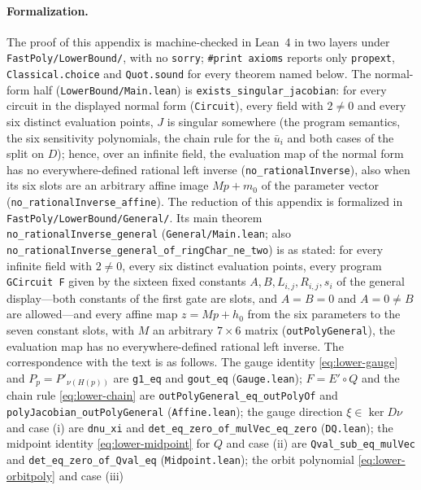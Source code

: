 \paragraph{Formalization.}
The proof of this appendix is machine-checked in Lean~4 in two layers under
\texttt{FastPoly/\allowbreak LowerBound/}, with no \texttt{sorry}; \texttt{\#print axioms}
reports only \texttt{propext}, \texttt{Classical.choice} and \texttt{Quot.sound} for
every theorem named below.  The normal-form half (\texttt{LowerBound/\allowbreak Main.lean})
is \texttt{exists\_singular\_jacobian}: for every circuit in the displayed normal form
(\texttt{Circuit}), every field with $2\neq0$ and every six distinct evaluation points,
$J$ is singular somewhere (the program semantics, the six sensitivity polynomials, the
chain rule for the $\bar u_i$ and both cases of the split on $D$); hence, over an
infinite field, the evaluation map of the normal form has no everywhere-defined rational
left inverse (\texttt{no\_rationalInverse}), also when its six slots are an arbitrary
affine image $Mp+m_0$ of the parameter vector (\texttt{no\_rationalInverse\_affine}).
The reduction of this appendix is formalized in
\texttt{FastPoly/\allowbreak LowerBound/\allowbreak General/}.  Its main theorem
\texttt{no\_rationalInverse\_general} (\texttt{General/\allowbreak Main.lean}; also
\texttt{no\_rationalInverse\_general\_of\_ringChar\_ne\_two}) is  as
stated: for every infinite field with $2\neq0$, every six distinct evaluation points, every
program \texttt{GCircuit F} given by the sixteen fixed constants $A,B,L_{i,j},R_{i,j},s_i$
of the general display---both constants of the first gate are slots, and $A=B=0$ and
$A=0\neq B$ are allowed---and every affine map $z=Mp+h_0$ from the six parameters to the
seven constant slots, with $M$ an arbitrary $7\times6$ matrix (\texttt{outPolyGeneral}),
the evaluation map has no everywhere-defined rational left inverse.  The correspondence
with the text is as follows.  The gauge identity \eqref{eq:lower-gauge} and
$P_p=P'_{\nu(H(p))}$ are \texttt{g1\_eq} and \texttt{gout\_eq} (\texttt{Gauge.lean});
$F=E'\circ Q$ and the chain rule \eqref{eq:lower-chain} are
\texttt{outPolyGeneral\_eq\_outPolyOf} and \texttt{polyJacobian\_outPolyGeneral}
(\texttt{Affine.lean}); the gauge direction $\xi\in\ker D\nu$ and case (i) are
\texttt{dnu\_xi} and \texttt{det\_eq\_zero\_of\_mulVec\_eq\_zero} (\texttt{DQ.lean}); the
midpoint identity \eqref{eq:lower-midpoint} for $Q$ and case (ii) are
\texttt{Qval\_sub\_eq\_mulVec} and \texttt{det\_eq\_zero\_of\_Qval\_eq}
(\texttt{Midpoint.lean}); the orbit polynomial \eqref{eq:lower-orbitpoly} and case (iii)
